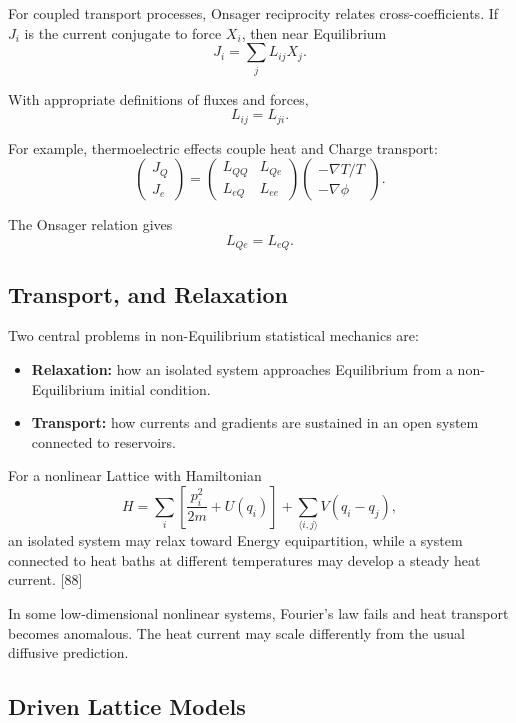 \documentclass[a4paper, 10pt, onepage]{elegantbook}
\begin{document}
{For coupled transport processes, Onsager reciprocity relates cross-coefficients.
If \(J_i\) is the current conjugate to force \(X_i\), then near Equilibrium
\[
J_i=\sum_jL_{ij}X_j.
\]

With appropriate definitions of fluxes and forces,
\[
L_{ij}=L_{ji}.
\]

For example, thermoelectric effects couple heat and Charge transport:
\[
\begin{pmatrix}
J_Q\\
J_e
\end{pmatrix}
=
\begin{pmatrix}
L_{QQ} & L_{Qe}\\
L_{eQ} & L_{ee}
\end{pmatrix}
\begin{pmatrix}
-\nabla T/T\\
-\nabla\phi
\end{pmatrix}.
\]

The Onsager relation gives
\[
L_{Qe}=L_{eQ}.
\]

\subsection{Transport, and Relaxation}

Two central problems in non-Equilibrium statistical mechanics are:

\begin{itemize}
\item \textbf{Relaxation:} how an isolated system approaches Equilibrium from
a non-Equilibrium initial condition.
\item \textbf{Transport:} how currents and gradients are sustained in an open
system connected to reservoirs.
\end{itemize}

For a nonlinear Lattice with Hamiltonian
\[
H=\sum_i\left[\frac{p_i^2}{2m}+U(q_i)\right]
+
\sum_{\langle i,j\rangle}V(q_i-q_j),
\]
an isolated system may relax toward Energy equipartition, while a system
connected to heat baths at different temperatures may develop a steady heat
current. [88]

In some low-dimensional nonlinear systems, Fourier's law fails and heat
transport becomes anomalous. The heat current may scale differently from the
usual diffusive prediction.

\subsection{Driven Lattice Models}

}
\end{document}
